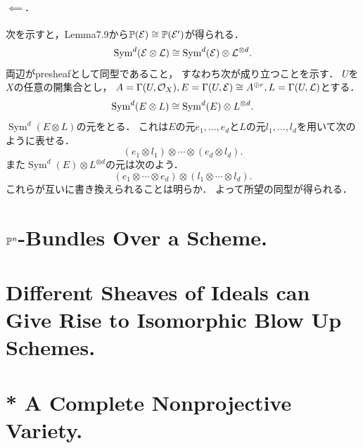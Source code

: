 \documentclass[a4paper]{jsarticle}
\newcommand{\Sym}{\operatorname{Sym}}
\newcommand{\pbundle}{\mathbb{P}}
\begin{document}
    \paragraph{$\impliedby$.}
    次を示すと，Lemma7.9から$\pbundle(\shE) \iso \pbundle(\shE')$が得られる．
    \[ \Sym^d(\shE \otimes \shL) \iso \Sym^d(\shE) \otimes \shL^{\otimes d}. \]
    両辺がpresheafとして同型であること，
    すなわち次が成り立つことを示す．
    $U$を$X$の任意の開集合とし，
    $A=\Gamma(U, \mathcal{O}_X), E=\Gamma(U, \mathcal{E}) \cong A^{\oplus r}, L=\Gamma(U, \mathcal{L})$とする．
    \[ \Sym^d(E \otimes L) \iso \Sym^d(E) \otimes L^{\otimes d}. \]
    $\Sym^d(E \otimes L)$の元をとる．
    これは$E$の元$e_1,\dots,e_d$と$L$の元$l_1,\dots,l_d$を用いて次のように表せる．
    \[ (e_1 \otimes l_1) \otimes \cdots \otimes (e_d \otimes l_d). \]
    また$\Sym^d(E) \otimes L^{\otimes d}$の元は次のよう．
    \[ (e_1 \otimes \cdots \otimes e_d) \otimes (l_1 \otimes \cdots \otimes l_d). \]
    これらが互いに書き換えられることは明らか．
    よって所望の同型が得られる．

\section{$\mathbb{P}^n$-Bundles Over a Scheme.} %

\section{Different Sheaves of Ideals can Give Rise to Isomorphic Blow Up Schemes.} %

\section{ } %

\section{* A Complete Nonprojective Variety.} %

\section{ } %
\end{document}
